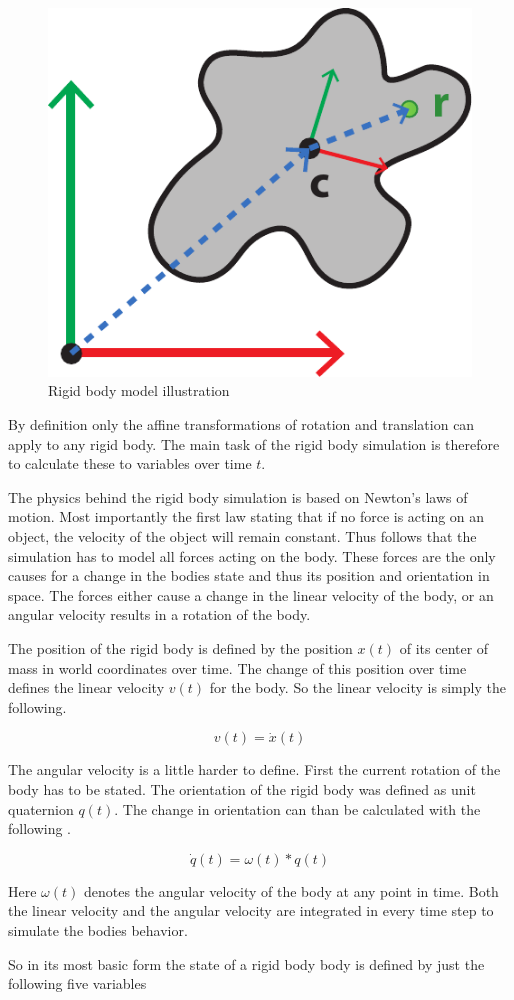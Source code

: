 \begin{figure}[htb]
\centering
\includegraphics[width=.4\textwidth]{images/rigid_body_1.pdf}
\caption{Rigid body model illustration}
\label{img:rigid_body}
\end{figure}

By definition only the affine transformations of rotation and translation can apply to any rigid body. The main task of the rigid body simulation is therefore to calculate these to variables over time \(t\).

The physics behind the rigid body simulation is based on Newton's laws of motion. Most importantly the first law stating that if no force is acting on an object, the velocity of the object will remain constant. Thus follows that the simulation has to model all forces acting on the body. These forces are the only causes for a change in the bodies state and thus its position and orientation in space. The forces either cause a change in the linear velocity of the body, or an angular velocity results in a rotation of the body. 

The position of the rigid body is defined by the position $x(t)$ of its center of mass in world coordinates over time. The change of this position over time defines the linear velocity $v(t)$ for the body. So the linear velocity is simply the following.

\[
v(t) = \dot{x}(t)
\]

The angular velocity is a little harder to define. First the current rotation of the body has to be stated. The orientation of the rigid body was defined as unit quaternion $q(t)$. The change in orientation can than be calculated with the following .

\[
\dot{q}(t) = \omega(t) * q(t)
\]

Here $\omega(t)$ denotes the angular velocity of the body at any point in time. Both the linear velocity and the angular velocity are integrated in every time step to simulate the bodies behavior.

So in its most basic form the state of a rigid body body is defined by just the following five variables

